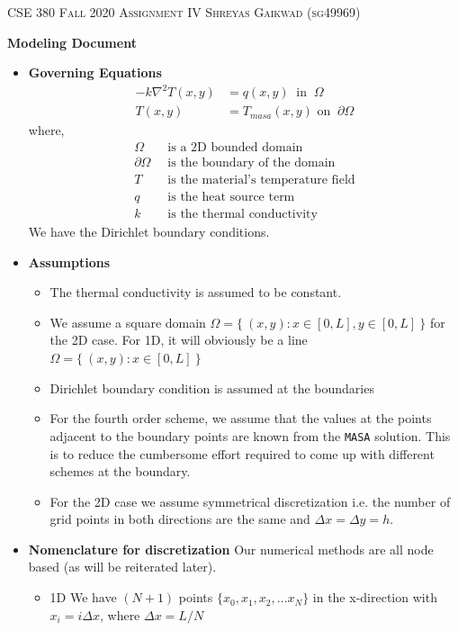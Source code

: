 \documentclass[12 pt, final]{article}
\begin{document}

\noindent\textsc{
CSE 380 Fall 2020
\hfill
Assignment IV
\hfill
Shreyas Gaikwad (sg49969)}

\begin{center}
\Large{\textbf{Modeling Document}}
\end{center}

\begin{itemize}
    \item \textbf{Governing Equations}
        \begin{align}
            -k\nabla^2 T(x,y) &= q(x,y) \:\text{ in }\: \Omega \label{eq1}\\
            T(x,y) &= T_{masa} (x,y) \text{ on }\: \partial\Omega \nonumber 
        \end{align}
        where,
        \begin{align*}
            \Omega &\:\text{ is a 2D bounded domain}\\
            \partial\Omega &\:\text{ is the boundary of the domain}\\
            T &\:\text{ is the material's temperature field}\\
            q &\:\text{ is the heat source term}\\
            k &\:\text{ is the thermal conductivity}
        \end{align*}
        We have the Dirichlet boundary conditions.
        
    \item \textbf{Assumptions}
        \begin{itemize}
            \item The thermal conductivity is assumed to be constant.
            \item We assume a square domain $\Omega = \{\:(x,y) : x \in [0,L], y \in [0,L]\:\}$ for the 2D case. For 1D, it will obviously be a line $\Omega = \{\:(x,y) : x \in [0,L]\:\}$
            \item Dirichlet boundary condition is assumed at the boundaries
            \item For the fourth order scheme, we assume that the values at the points adjacent to the boundary points are known from the \texttt{MASA} solution. This is to reduce the cumbersome effort required to come up with different schemes at the boundary.
            \item For the 2D case we assume symmetrical discretization i.e. the number of grid points in both directions are the same and $\Delta x = \Delta y = h$.
        \end{itemize}
    \item \textbf{Nomenclature for discretization}
    Our numerical methods are all node based (as will be reiterated later).
        \begin{itemize}
            \item 1D We have $(N+1)$ points $\{x_0,x_1,x_2,\hdots x_N\}$ in the x-direction with $x_i=i\Delta x$, where $\Delta x = L/N$
                

\end{itemize}
\end{itemize}
\end{document}
